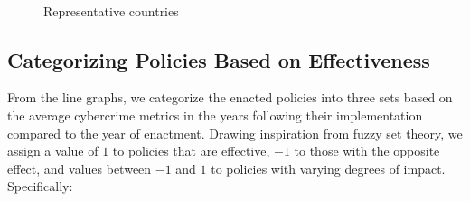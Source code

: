 \begin{figure}[htb]
{            }\hfill
            \hfill
            \\
            \caption{Representative countries}\label{fig:representative-policy}
        \end{figure}
    
\subsection{Categorizing Policies Based on Effectiveness}\label{subsec:categorizing-policies-based-on-effectiveness} %
    From the line graphs, we categorize the enacted policies into three sets
    based on the average cybercrime metrics in the years following their implementation compared to the year of enactment.
    Drawing inspiration from fuzzy set theory,
    we assign a value of \(1\) to policies that are effective,
    \(-1\) to those with the opposite effect,
    and values between \(-1\) and \(1\) to policies with varying degrees of impact.
    Specifically:

